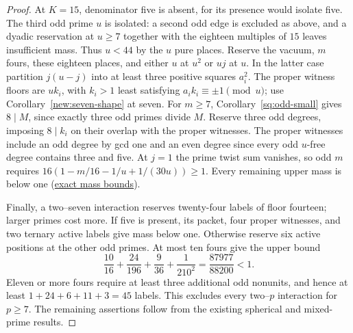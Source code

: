 \documentclass[11pt]{amsart}
\numberwithin{equation}{section}
\theoremstyle{definition}
\theoremstyle{plain}
\newcommand{\supfile}[2]{\href{run:rank-bound-supplement/#1}{#2}}
\begin{document}
\begin{proof}
At $K=15$, denominator five is absent, for its presence would isolate five. The third odd prime $u$ is isolated: a second odd edge is excluded as above, and a dyadic reservation at $u\ge7$
together with the eighteen multiples of $15$ leaves insufficient mass. Thus
$u<44$ by the $u$ pure places. Reserve the vacuum, $m$ fours, these
eighteen places, and either $u$ at $u^2$ or $uj$ at $u$. In the latter
case partition $j(u-j)$ into at least three positive squares $a_i^2$.
The proper witness floors are $uk_i$, with $k_i>1$ least satisfying
$a_ik_i\equiv\pm1\pmod u$; use Corollary~\ref{new:seven-shape} at seven.
For $m\ge7$, Corollary~\ref{sq:odd-small} gives $8\mid M$, since exactly
three odd primes divide $M$. Reserve three odd degrees, imposing
$8\mid k_i$ on their overlap with the proper witnesses. The proper
witnesses include an odd degree by gcd one and an even degree since
every odd $u$-free degree contains three and five.
At $j=1$ the prime twist sum vanishes, so odd $m$ requires
$16(1-m/16-1/u+1/(30u))\ge1$. Every remaining upper mass is below one
(\supfile{arithmetic/odd_edge_mass.py}{exact mass bounds}).

Finally, a two--seven interaction reserves twenty-four labels of
floor fourteen; larger primes cost more. If five is present, its
packet, four proper witnesses, and two ternary active labels give
mass below one. Otherwise reserve six active positions at the other
odd primes. At most ten fours give the upper bound
\[
                  \frac{10}{16}+\frac{24}{196}
                       +\frac9{36}+\frac1{210^2}
                         =\frac{87977}{88200}<1.
\]
Eleven or more fours require at least three additional odd nonunits,
and hence at least $1+24+6+11+3=45$ labels. This excludes every
two--$p$ interaction for $p\ge7$. The remaining assertions follow
from the existing spherical and mixed-prime results.
\end{proof}
\end{document}
